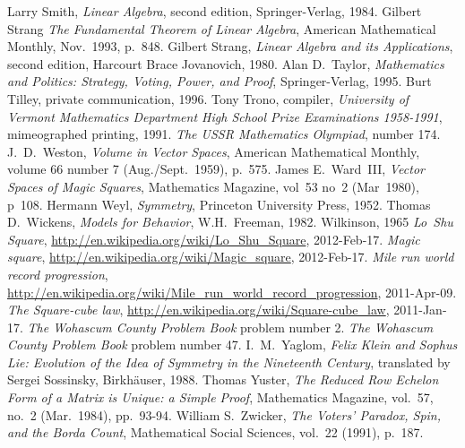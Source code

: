 \begin{thebibliography}{\makebox[2em][c]{{}\hfil{}}}
  Larry Smith,
  \emph{Linear Algebra},
  second edition,
  Springer-Verlag,
  1984.
  Gilbert Strang
  \emph{The Fundamental Theorem of Linear Algebra},
  American Mathematical Monthly,
  Nov.~1993, p.~848.
  Gilbert Strang,
  \emph{Linear Algebra and its Applications},
  second edition,
  Harcourt Brace Jovanovich,
  1980.
  Alan D.~Taylor,
  \emph{Mathematics and Politics: Strategy, Voting, Power, and Proof},
  Springer-Verlag,
  1995.
  Burt Tilley,
  private communication,
  1996.
  Tony Trono, compiler,
  \emph{University of Vermont Mathematics Department High School Prize
    Examinations 1958-1991},
  mimeographed printing, 1991.
  \emph{The USSR Mathematics Olympiad},
   number 174.
  J.~D.\ Weston,
  \emph{Volume in Vector Spaces},
  American Mathematical Monthly,
  volume 66 number 7 (Aug./Sept.\ 1959),
  p.~575.
  James E.\ Ward~III,
  \emph{Vector Spaces of Magic Squares},
  Mathematics Magazine,
  vol~53 no~2 (Mar~1980),
  p~108.
  Hermann Weyl,
  \emph{Symmetry},
  Princeton University Press,
  1952.
  Thomas D.~Wickens,
  \emph{Models for Behavior},
  W.H.~Freeman,
  1982.
  Wilkinson,
  1965
  \emph{Lo~Shu Square},
  \url{http://en.wikipedia.org/wiki/Lo_Shu_Square},
  2012-Feb-17.
  \emph{Magic square},
  \url{http://en.wikipedia.org/wiki/Magic_square},
  2012-Feb-17.
  \emph{Mile run world record progression},
  \url{http://en.wikipedia.org/wiki/Mile_run_world_record_progression},
  2011-Apr-09.
  \emph{The Square-cube law},
  \url{http://en.wikipedia.org/wiki/Square-cube_law},
  2011-Jan-17.
  \emph{The Wohascum County Problem Book}
  problem number 2.
  \emph{The Wohascum County Problem Book}
  problem number 47.
  I.\ M.~Yaglom,
  \emph{Felix Klein and Sophus Lie: Evolution of the Idea of
   Symmetry in the Nineteenth Century},
  translated by Sergei Sossinsky,
  Birkh\"auser,
  1988.
  Thomas Yuster,
  \emph{The Reduced Row Echelon Form of a Matrix is Unique: a Simple Proof},
  Mathematics Magazine,
  vol.~57, no.~2 (Mar.~1984),
  pp.~93-94.
  William S.~Zwicker,
  \emph{The Voters' Paradox, Spin, and the Borda Count},
  Mathematical Social Sciences,
  vol.~22 (1991),
  p.~187. 
\end{thebibliography}
